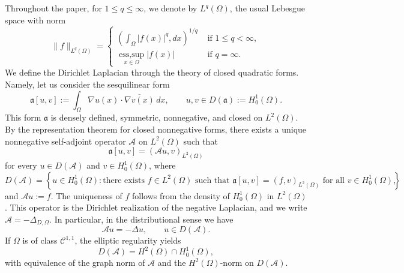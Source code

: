 \documentclass[10pt,a4paper]{amsart}
\numberwithin{equation}{section}
\begin{document}
Throughout the paper, for $1\le q\le\infty$, we denote by $L^q(\Omega)$, the usual Lebesgue space with norm
$$
\|f\|_{L^q(\Omega)}
=
\begin{cases}
    \left(\displaystyle\int_\Omega |f(x)|^q,dx \right)^{1/q} &\text{ if } 1\le q<\infty, \\
    \operatorname*{ess,sup}_{x\in\Omega} |f(x)| &\text{ if } q= \infty.
\end{cases}
$$
We define the Dirichlet Laplacian through the theory of closed quadratic forms. Namely, let us consider the sesquilinear form
\begin{equation*}
\mathfrak a[u,v]
:=
\int_{\Omega}
\nabla u(x)\cdot\overline{\nabla v(x)}\,dx,
\qquad
u,v\in D(\mathfrak a):=H_0^1(\Omega).
\end{equation*}
This form \(\mathfrak a\) is densely defined, symmetric, nonnegative, and closed on \(L^2(\Omega)\). By the representation theorem for closed nonnegative forms, there
exists a unique nonnegative self-adjoint operator  \(\mathcal{A}\) on \(L^2(\Omega)\) such that
\begin{equation*}
\mathfrak a[u,v]
=
(\mathcal{A}u,v)_{L^2(\Omega)}
\end{equation*}
for every \(u\in D(\mathcal{A})\) and \(v\in H_0^1(\Omega)\), where
\begin{equation*}
D(\mathcal{A})
=
\left\{
u\in H_0^1(\Omega):
\text{there exists } f\in L^2(\Omega)
\text{ such that }
\mathfrak a[u,v]=(f,v)_{L^2(\Omega)}
\text{ for all }v\in H_0^1(\Omega)
\right\},
\end{equation*}
and \(\mathcal{A}u:=f\). The uniqueness of \(f\) follows from the density of \(H_0^1(\Omega)\) in \(L^2(\Omega)\). This operator is the Dirichlet realization of the negative Laplacian, and we write $\mathcal{A}=-\Delta_{D,\Omega}$. In particular, in the distributional sense we have
\[
\mathcal{A}u=-\Delta u,
\qquad
u\in D(\mathcal{A}).
\]
If \(\Omega\) is of class \(\mathcal{C}^{1,1}\), the elliptic regularity yields
\begin{equation*}
D(\mathcal{A})
=
H^2(\Omega)\cap H_0^1(\Omega),
\end{equation*}
with equivalence of the graph norm of \(\mathcal{A}\) and the \(H^2(\Omega)\)-norm on \(D(\mathcal{A})\).
\end{document}
